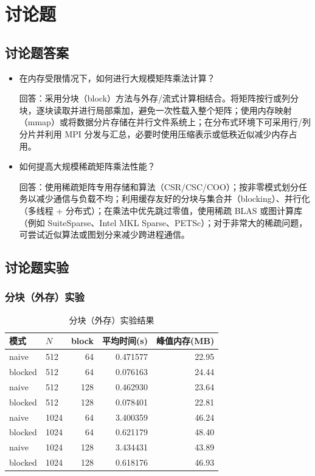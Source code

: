 \documentclass{SYSUReport}
\begin{document}
\section{讨论题}

\subsection{讨论题答案}

\begin{itemize}
\item 在内存受限情况下，如何进行大规模矩阵乘法计算？

回答：采用分块（block）方法与外存/流式计算相结合。将矩阵按行或列分块，逐块读取并进行局部乘加，避免一次性载入整个矩阵；使用内存映射（mmap）或将数据分片存储在并行文件系统上；在分布式环境下可采用行/列分片并利用 MPI 分发与汇总，必要时使用压缩表示或低秩近似减少内存占用。

\item 如何提高大规模稀疏矩阵乘法性能？

回答：使用稀疏矩阵专用存储和算法（CSR/CSC/COO）；按非零模式划分任务以减少通信与负载不均；利用缓存友好的分块与集合并（blocking）、并行化（多线程 + 分布式）；在乘法中优先跳过零值，使用稀疏 BLAS 或图计算库（例如 SuiteSparse、Intel MKL Sparse、PETSc）；对于非常大的稀疏问题，可尝试近似算法或图划分来减少跨进程通信。

\end{itemize}

\subsection{讨论题实验}

\subsubsection {分块（外存）实验}
\begin{table}[htbp]
\centering
\label{tab:mem-full}
\begin{tabular}{llrrr}
\toprule
模式 & $N$ & block & 平均时间(s) & 峰值内存(MB) \\
\midrule
naive & 512 & 64 & 0.471577 & 22.95 \\
blocked & 512 & 64 & 0.076163 & 24.44 \\
naive & 512 & 128 & 0.462930 & 23.64 \\
blocked & 512 & 128 & 0.078401 & 22.81 \\
naive & 1024 & 64 & 3.400359 & 46.24 \\
blocked & 1024 & 64 & 0.621179 & 48.40 \\
naive & 1024 & 128 & 3.434431 & 43.89 \\
blocked & 1024 & 128 & 0.618176 & 46.93 \\
\bottomrule
\end{tabular}
\caption{分块（外存）实验结果}
\end{table}
\end{document}

